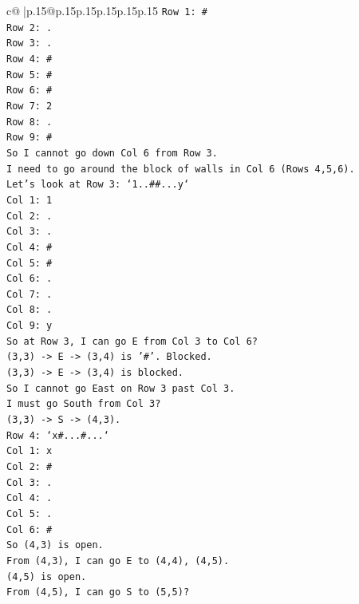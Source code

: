 \documentclass{article}
\begin{document}
{\begin{supertabular}{c@{$\;$}|p{.15\linewidth}@{}p{.15\linewidth}p{.15\linewidth}p{.15\linewidth}p{.15\linewidth}p{.15\linewidth}}
{{{\texttt{Row 1: \#} \\
\texttt{Row 2: .} \\
\texttt{Row 3: .} \\
\texttt{Row 4: \#} \\
\texttt{Row 5: \#} \\
\texttt{Row 6: \#} \\
\texttt{Row 7: 2} \\
\texttt{Row 8: .} \\
\texttt{Row 9: \#} \\
\texttt{So I cannot go down Col 6 from Row 3.} \\
\texttt{I need to go around the block of walls in Col 6 (Rows 4,5,6).} \\
\texttt{Let's look at Row 3: `1..\#\#...y`} \\
\texttt{Col 1: 1} \\
\texttt{Col 2: .} \\
\texttt{Col 3: .} \\
\texttt{Col 4: \#} \\
\texttt{Col 5: \#} \\
\texttt{Col 6: .} \\
\texttt{Col 7: .} \\
\texttt{Col 8: .} \\
\texttt{Col 9: y} \\
\texttt{So at Row 3, I can go E from Col 3 to Col 6?} \\
\texttt{(3,3) {-}> E {-}> (3,4) is '\#'. Blocked.} \\
\texttt{(3,3) {-}> E {-}> (3,4) is blocked.} \\
\texttt{So I cannot go East on Row 3 past Col 3.} \\
\texttt{I must go South from Col 3?} \\
\texttt{(3,3) {-}> S {-}> (4,3).} \\
\texttt{Row 4: `x\#...\#...`} \\
\texttt{Col 1: x} \\
\texttt{Col 2: \#} \\
\texttt{Col 3: .} \\
\texttt{Col 4: .} \\
\texttt{Col 5: .} \\
\texttt{Col 6: \#} \\
\texttt{So (4,3) is open.} \\
\texttt{From (4,3), I can go E to (4,4), (4,5).} \\
\texttt{(4,5) is open.} \\
\texttt{From (4,5), I can go S to (5,5)?} \\
}}}
\end{supertabular}}
\end{document}
